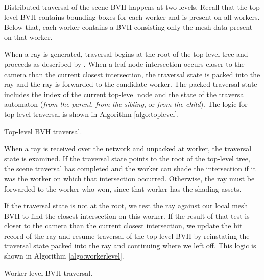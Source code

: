 \documentclass[a4paper,twoside]{article}
\begin{document}
Distributed traversal of the scene BVH happens at two levels. Recall that the
top level BVH contains bounding boxes for each worker and is present on all
workers. Below that, each worker contains a BVH consisting only the mesh data
present on that worker.

When a ray is generated, traversal begins at the root of the top level tree
and proceeds as described by \cite{hapala:2011}. When a leaf node
intersection occurs closer to the camera than the current closest intersection,
the traversal state is packed into the ray and the ray is forwarded to the
candidate worker. The packed traversal state includes the index of the current
top-level node and the state of the traversal automaton (\emph{from the parent},
\emph{from the sibling}, or \emph{from the child}). The logic for top-level
traversal is shown in Algorithm \ref{algo:toplevel}.

\begin{algorithm}
    \SetAlgoLined


    \caption{Top-level BVH traversal.}
    \label{algo:toplevel}
\end{algorithm}

When a ray is received over the network and unpacked at worker, the traversal
state is examined. If the traversal state points to the root of the top-level
tree, the scene traversal has completed and the worker can shade the
intersection if it was the worker on which that intersection occurred.
Otherwise, the ray must be forwarded to the worker who won, since that worker has
the shading assets.

If the traversal state is not at the root, we test the ray against our local
mesh BVH to find the closest intersection on this worker. If the result of that
test is closer to the camera than the current closest intersection, we update
the hit record of the ray and resume traversal of the top-level BVH by
reinstating the traversal state packed into the ray and continuing where we left
off. This logic is shown in Algorithm \ref{algo:workerlevel}.

\begin{algorithm}
    \SetAlgoLined


    \caption{Worker-level BVH traversal.}
    \label{algo:workerlevel}
\end{algorithm}
\end{document}
